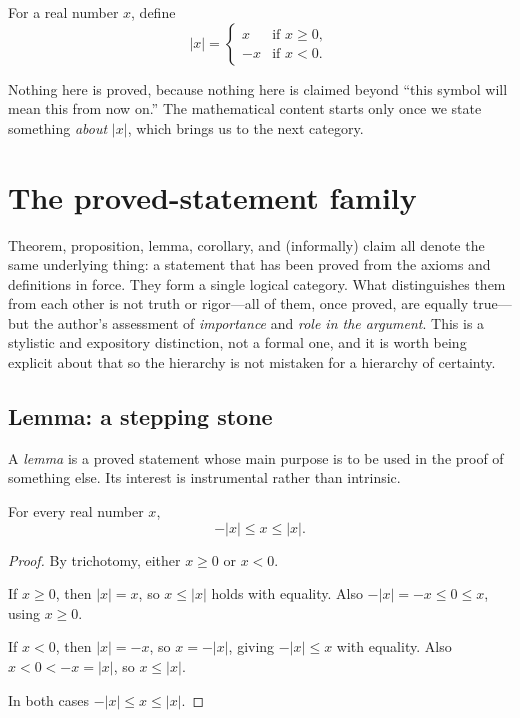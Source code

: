 \documentclass{essay}
\begin{document}
\begin{definition}
For a real number \(x\), define
\[
|x| =
\begin{cases}
x & \text{if } x \ge 0,\\
-x & \text{if } x < 0.
\end{cases}
\]
\end{definition}

Nothing here is proved, because nothing here is claimed beyond ``this symbol will mean this from now on.'' The mathematical content starts only once we state something \emph{about} \(|x|\), which brings us to the next category.

\section{The proved-statement family}

Theorem, proposition, lemma, corollary, and (informally) claim all denote the same underlying thing: a statement that has been proved from the axioms and definitions in force. They form a single logical category. What distinguishes them from each other is not truth or rigor---all of them, once proved, are equally true---but the author's assessment of \emph{importance} and \emph{role in the argument}. This is a stylistic and expository distinction, not a formal one, and it is worth being explicit about that so the hierarchy is not mistaken for a hierarchy of certainty.

\subsection{Lemma: a stepping stone}

\begin{definition}
A \emph{lemma} is a proved statement whose main purpose is to be used in the proof of something else. Its interest is instrumental rather than intrinsic.
\end{definition}

\begin{lemma}
\label{lem:abs-bounds}
For every real number \(x\),
\[
-|x| \le x \le |x|.
\]
\end{lemma}

\begin{proof}
By trichotomy, either \(x \ge 0\) or \(x<0\).

If \(x\ge 0\), then \(|x|=x\), so \(x\le|x|\) holds with equality. Also \(-|x|=-x\le 0\le x\), using \(x\ge0\).

If \(x<0\), then \(|x|=-x\), so \(x=-|x|\), giving \(-|x|\le x\) with equality. Also \(x<0<-x=|x|\), so \(x\le|x|\).

In both cases \(-|x|\le x\le|x|\).
\end{proof}
\end{document}

